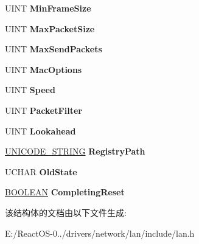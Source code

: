 \begin{DoxyCompactItemize}
\item 
\mbox{\label{struct_l_a_n___a_d_a_p_t_e_r_a4de0f4de293d82cadd7db00945a944d6}} 
U\+I\+NT {\bfseries Min\+Frame\+Size}
\item 
\mbox{\label{struct_l_a_n___a_d_a_p_t_e_r_af5f9c084ba5b1d5f5b9aa26ae9d0e90d}} 
U\+I\+NT {\bfseries Max\+Packet\+Size}
\item 
\mbox{\label{struct_l_a_n___a_d_a_p_t_e_r_abc2b98f465827cc5f0b0017619a62649}} 
U\+I\+NT {\bfseries Max\+Send\+Packets}
\item 
\mbox{\label{struct_l_a_n___a_d_a_p_t_e_r_aacf05101fd96facd7c89346562b51216}} 
U\+I\+NT {\bfseries Mac\+Options}
\item 
\mbox{\label{struct_l_a_n___a_d_a_p_t_e_r_ae5d163a5fcae1ffae3fd7b24c8296ab2}} 
U\+I\+NT {\bfseries Speed}
\item 
\mbox{\label{struct_l_a_n___a_d_a_p_t_e_r_a059de9cec785e36b0c5c939c994711d5}} 
U\+I\+NT {\bfseries Packet\+Filter}
\item 
\mbox{\label{struct_l_a_n___a_d_a_p_t_e_r_ab148d840e8bc7d73eb692d6d74c8d6c8}} 
U\+I\+NT {\bfseries Lookahead}
\item 
\mbox{\label{struct_l_a_n___a_d_a_p_t_e_r_a5982ce3f00a2668cc9b4460ff8b1f29f}} 
\hyperlink{struct___u_n_i_c_o_d_e___s_t_r_i_n_g}{U\+N\+I\+C\+O\+D\+E\+\_\+\+S\+T\+R\+I\+NG} {\bfseries Registry\+Path}
\item 
\mbox{\label{struct_l_a_n___a_d_a_p_t_e_r_a0be43d7b4a44cacd11e0490397157bf8}} 
U\+C\+H\+AR {\bfseries Old\+State}
\item 
\mbox{\label{struct_l_a_n___a_d_a_p_t_e_r_a8d18ff94b1c464541b89691f92615a86}} 
\hyperlink{_processor_bind_8h_a112e3146cb38b6ee95e64d85842e380a}{B\+O\+O\+L\+E\+AN} {\bfseries Completing\+Reset}
\end{DoxyCompactItemize}


该结构体的文档由以下文件生成\+:\begin{DoxyCompactItemize}
\item 
E\+:/\+React\+O\+S-\/0../drivers/network/lan/include/lan.\+h\end{DoxyCompactItemize}

